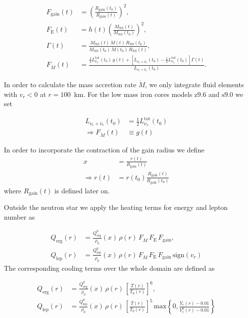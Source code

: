 \documentclass[fleqn,usenatbib]{mnras}
\newcommand{\snine}{\ensuremath{\mathrm{s9.0}}\xspace}
\newcommand{\znine}{\ensuremath{\mathrm{z9.6}}\xspace}
\begin{document}
\begin{align}
    F_\mathrm{gain}(t) &=
    \left(\frac{R_\mathrm{gain}(t_0)}{R_\mathrm{gain}(t)}\right)^2 , \\
    F_\mathrm{E}(t) &= h(t)
    \left(\frac{M_\mathrm{NS}(t)}{M_\mathrm{NS}(t_0)}\right)^2 , \\
    \Gamma(t) &= \frac{M_\mathrm{NS}(t) \,\dot{M}(t)
    \,R_\mathrm{NS}(t_0)}{M_\mathrm{NS}(t_0) \,\dot{M}(t_0) \,R_\mathrm{NS}(t)} , \\
    F_{\dot{M}}(t) &= \frac{\frac{1}{2} L_{\nu_x}^\mathrm{tot}(t_0) \,g(t) + \left[
    L_{\nu_e+\bar{\nu}_e}(t_0) - \frac{1}{2} L_{\nu_x}^\mathrm{tot}(t_0)
    \right] \Gamma(t)}{L_{\nu_e+\bar{\nu}_e}(t_0)}.
\end{align}

In order to calculate the mass accretion rate $\dot{M}$, we only integrate fluid elements with $v_r < 0$ at $r = 100$~km.
For the low mass iron cores models \znine and \snine we set

\begin{align}
    L_{\nu_e+\bar{\nu}_e}(t_0) &= \frac{1}{2} L_{\nu_x}^\mathrm{tot}(t_0) \\
    \Rightarrow F_{\dot{M}}(t) &\equiv g(t)
\end{align}

In order to incorporate the contraction of the gain radius we define
\begin{align}
    x &= \frac{r(t)}{R_\mathrm{gain}(t)} \\
    \Rightarrow r(t) &= r(t_0) \frac{R_\mathrm{gain}(t)}{R_\mathrm{gain}(t_0)}
\end{align}
where $R_{\mathrm{gain}}(t)$ is defined later on.



Outside the neutron star we apply the heating terms for energy and lepton number as

\begin{align}
    Q_\mathrm{erg}(r) &= \frac{Q_\mathrm{erg}^0}{\rho_0}(x) \,\rho (r)
    \,F_{\dot{M}} \,F_\mathrm{E} \,F_\mathrm{gain} , \\
    Q_\mathrm{lep}(r) &= \frac{Q_\mathrm{lep}^0}{\rho_0}(x) \,\rho (r)
    \,F_{\dot{M}} \,F_\mathrm{E} \,F_\mathrm{gain} \,\mathrm{sign}(v_r)
\end{align}
The corresponding cooling terms over the whole domain are defined as 

\begin{align}
    Q_\mathrm{erg}(r) &= \frac{Q_\mathrm{erg}^0}{\rho_0}(x) \,\rho (r)
    \,\left[\frac{T(r)}{T_0(r)}\right]^6 , \\
    Q_\mathrm{lep}(r) &= \frac{Q_\mathrm{lep}^0}{\rho_0}(x) \,\rho (r)
    \,\left[\frac{T(r)}{T_0(r)}\right]^5 \, \mathrm{max}\left\{0, \frac{Y_e(r) -
    0.01}{Y_e^0(r) - 0.01}\right\} %
\end{align}
\end{document}
